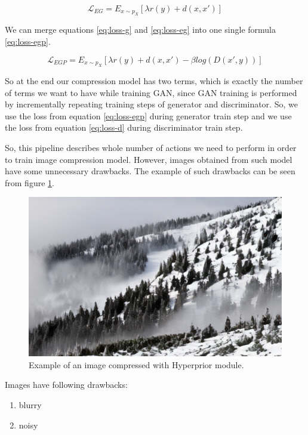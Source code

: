 \begin{equation}
    \label{eq:loss-eg}
    \mathcal{L}_{EG}=E_{x\sim p_X}[\lambda r(y)+d(x, x')]
\end{equation}

We can merge equations \ref{eq:loss-g} and \ref{eq:loss-eg} into one single formula \ref{eq:loss-egp}.

\begin{equation}
    \label{eq:loss-egp}
    \mathcal{L}_{EGP}=E_{x\sim p_X}[\lambda r(y)+d(x, x')-\beta log(D(x',y))]
\end{equation}

So at the end our compression model has two terms, which is exactly the number of terms we want to have while training GAN, since GAN training is performed by incrementally repeating training steps of generator and discriminator. So, we use the loss from equation \ref{eq:loss-egp} during generator train step and we use the loss from equation \ref{eq:loss-d} during discriminator train step.

So, this pipeline describes whole number of actions we need to perform in order to train image compression model. However, images obtained from such model have some unnecessary drawbacks. The example of such drawbacks can be seen from figure \ref{forest-blurry}.

\begin{figure}[!ht]
    \centering
    \includegraphics[width=\textwidth]{figure/forest-blurry.png}
    \caption{Example of an image compressed with Hyperprior module.}
    \label{forest-blurry}
\end{figure}

Images have following drawbacks:

\begin{enumerate}
    \item blurry
    \item noisy
\end{enumerate}

